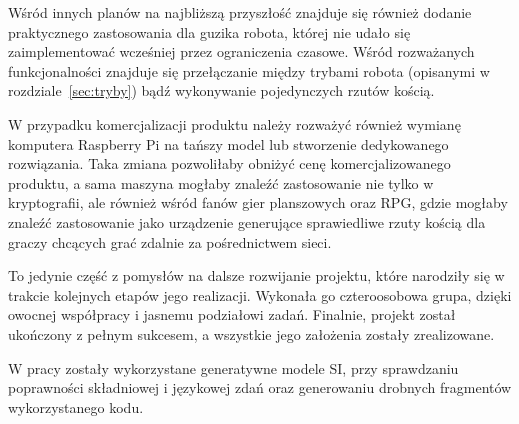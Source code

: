 Wśród innych planów na najbliższą przyszłość znajduje się również dodanie praktycznego zastosowania dla guzika robota,
której nie udało się zaimplementować wcześniej przez ograniczenia czasowe. Wśród rozważanych funkcjonalności znajduje się
przełączanie między trybami robota (opisanymi w rozdziale~\ref{sec:tryby}) bądź wykonywanie pojedynczych rzutów kością.

W przypadku komercjalizacji produktu należy rozważyć również wymianę komputera Raspberry Pi na tańszy model lub stworzenie dedykowanego rozwiązania.
Taka zmiana pozwoliłaby obniżyć cenę komercjalizowanego produktu, a sama maszyna mogłaby znaleźć zastosowanie nie tylko w kryptografii,
ale również wśród fanów gier planszowych oraz RPG, gdzie mogłaby znaleźć zastosowanie jako urządzenie generujące sprawiedliwe rzuty kością
dla graczy chcących grać zdalnie za pośrednictwem sieci.

To jedynie część z pomysłów na dalsze rozwijanie projektu, które narodziły się w trakcie kolejnych etapów jego realizacji.
Wykonała go czteroosobowa grupa, dzięki owocnej współpracy i jasnemu podziałowi zadań. 
Finalnie, projekt został ukończony z pełnym sukcesem, a wszystkie jego założenia zostały zrealizowane.

W pracy zostały wykorzystane generatywne modele SI, przy sprawdzaniu poprawności składniowej i językowej zdań oraz generowaniu drobnych fragmentów wykorzystanego kodu.

